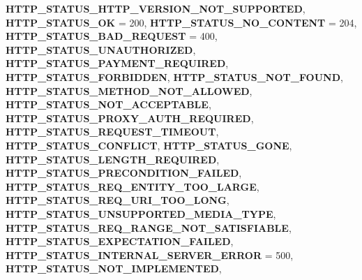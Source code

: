 \begin{DoxyCompactItemize}
{\bfseries H\+T\+T\+P\+\_\+\+S\+T\+A\+T\+U\+S\+\_\+\+H\+T\+T\+P\+\_\+\+V\+E\+R\+S\+I\+O\+N\+\_\+\+N\+O\+T\+\_\+\+S\+U\+P\+P\+O\+R\+T\+ED}, 
{\bfseries H\+T\+T\+P\+\_\+\+S\+T\+A\+T\+U\+S\+\_\+\+OK} = 200, 
{\bfseries H\+T\+T\+P\+\_\+\+S\+T\+A\+T\+U\+S\+\_\+\+N\+O\+\_\+\+C\+O\+N\+T\+E\+NT} = 204, 
\newline
{\bfseries H\+T\+T\+P\+\_\+\+S\+T\+A\+T\+U\+S\+\_\+\+B\+A\+D\+\_\+\+R\+E\+Q\+U\+E\+ST} = 400, 
{\bfseries H\+T\+T\+P\+\_\+\+S\+T\+A\+T\+U\+S\+\_\+\+U\+N\+A\+U\+T\+H\+O\+R\+I\+Z\+ED}, 
{\bfseries H\+T\+T\+P\+\_\+\+S\+T\+A\+T\+U\+S\+\_\+\+P\+A\+Y\+M\+E\+N\+T\+\_\+\+R\+E\+Q\+U\+I\+R\+ED}, 
{\bfseries H\+T\+T\+P\+\_\+\+S\+T\+A\+T\+U\+S\+\_\+\+F\+O\+R\+B\+I\+D\+D\+EN}, 
\newline
{\bfseries H\+T\+T\+P\+\_\+\+S\+T\+A\+T\+U\+S\+\_\+\+N\+O\+T\+\_\+\+F\+O\+U\+ND}, 
{\bfseries H\+T\+T\+P\+\_\+\+S\+T\+A\+T\+U\+S\+\_\+\+M\+E\+T\+H\+O\+D\+\_\+\+N\+O\+T\+\_\+\+A\+L\+L\+O\+W\+ED}, 
{\bfseries H\+T\+T\+P\+\_\+\+S\+T\+A\+T\+U\+S\+\_\+\+N\+O\+T\+\_\+\+A\+C\+C\+E\+P\+T\+A\+B\+LE}, 
{\bfseries H\+T\+T\+P\+\_\+\+S\+T\+A\+T\+U\+S\+\_\+\+P\+R\+O\+X\+Y\+\_\+\+A\+U\+T\+H\+\_\+\+R\+E\+Q\+U\+I\+R\+ED}, 
\newline
{\bfseries H\+T\+T\+P\+\_\+\+S\+T\+A\+T\+U\+S\+\_\+\+R\+E\+Q\+U\+E\+S\+T\+\_\+\+T\+I\+M\+E\+O\+UT}, 
{\bfseries H\+T\+T\+P\+\_\+\+S\+T\+A\+T\+U\+S\+\_\+\+C\+O\+N\+F\+L\+I\+CT}, 
{\bfseries H\+T\+T\+P\+\_\+\+S\+T\+A\+T\+U\+S\+\_\+\+G\+O\+NE}, 
{\bfseries H\+T\+T\+P\+\_\+\+S\+T\+A\+T\+U\+S\+\_\+\+L\+E\+N\+G\+T\+H\+\_\+\+R\+E\+Q\+U\+I\+R\+ED}, 
\newline
{\bfseries H\+T\+T\+P\+\_\+\+S\+T\+A\+T\+U\+S\+\_\+\+P\+R\+E\+C\+O\+N\+D\+I\+T\+I\+O\+N\+\_\+\+F\+A\+I\+L\+ED}, 
{\bfseries H\+T\+T\+P\+\_\+\+S\+T\+A\+T\+U\+S\+\_\+\+R\+E\+Q\+\_\+\+E\+N\+T\+I\+T\+Y\+\_\+\+T\+O\+O\+\_\+\+L\+A\+R\+GE}, 
{\bfseries H\+T\+T\+P\+\_\+\+S\+T\+A\+T\+U\+S\+\_\+\+R\+E\+Q\+\_\+\+U\+R\+I\+\_\+\+T\+O\+O\+\_\+\+L\+O\+NG}, 
{\bfseries H\+T\+T\+P\+\_\+\+S\+T\+A\+T\+U\+S\+\_\+\+U\+N\+S\+U\+P\+P\+O\+R\+T\+E\+D\+\_\+\+M\+E\+D\+I\+A\+\_\+\+T\+Y\+PE}, 
\newline
{\bfseries H\+T\+T\+P\+\_\+\+S\+T\+A\+T\+U\+S\+\_\+\+R\+E\+Q\+\_\+\+R\+A\+N\+G\+E\+\_\+\+N\+O\+T\+\_\+\+S\+A\+T\+I\+S\+F\+I\+A\+B\+LE}, 
{\bfseries H\+T\+T\+P\+\_\+\+S\+T\+A\+T\+U\+S\+\_\+\+E\+X\+P\+E\+C\+T\+A\+T\+I\+O\+N\+\_\+\+F\+A\+I\+L\+ED}, 
{\bfseries H\+T\+T\+P\+\_\+\+S\+T\+A\+T\+U\+S\+\_\+\+I\+N\+T\+E\+R\+N\+A\+L\+\_\+\+S\+E\+R\+V\+E\+R\+\_\+\+E\+R\+R\+OR} = 500, 
{\bfseries H\+T\+T\+P\+\_\+\+S\+T\+A\+T\+U\+S\+\_\+\+N\+O\+T\+\_\+\+I\+M\+P\+L\+E\+M\+E\+N\+T\+ED}, 

\end{DoxyCompactItemize}
